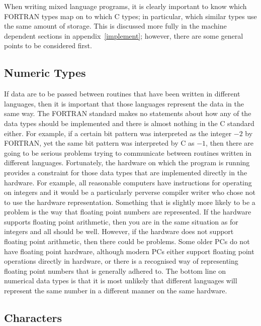 \documentclass[twoside,11pt]{article}
\newcommand{\htmlref}[2]{#1}
\newcommand{\latex}[1]{#1}
\newcommand{\xlabel}[1]{}
\renewcommand{\_}{\texttt{\symbol{95}}}
\begin{document}
When writing mixed language programs, it is clearly important to know which
FORTRAN types map on to which C types; in particular, which similar types use
the same amount of storage. This is discussed more fully in 
\htmlref{the machine dependent sections}{implement}
\latex{in appendix~\ref{implement}}; however, there are some general
points to be considered first.

\subsection{\xlabel{numeric_types}Numeric Types}

If data are to be passed between routines that have been written in different
languages, then it is important that those languages represent the data in the
same way. The FORTRAN standard makes no statements about how any of the data
types should be implemented and there is almost nothing in the C standard
either. For example, if a certain bit pattern was interpreted as the integer
$-2$ by FORTRAN, yet the same bit pattern was interpreted by C as $-1$, then
there are going to be serious problems trying to communicate between routines
written in different languages. Fortunately, the hardware on which the program
is running provides a constraint for those data types that are implemented
directly in the  hardware. For example, all reasonable computers have
instructions for operating on integers and it would be a particularly perverse
compiler writer who chose not to use the hardware representation. Something
that is slightly more likely to be a problem is the way that floating point
numbers are represented. If the hardware supports floating point arithmetic,
then you are in the same situation as for integers and all should be well.
However, if the hardware does not support floating point arithmetic, then there
could be problems. Some older PCs do not have floating point hardware, although
modern PCs either support floating point operations directly in hardware, or
there is a recognised way of representing floating point numbers that is
generally adhered to. The bottom line on numerical data types is that it is
most unlikely that different languages will represent the same number in a
different manner on the same hardware.

\subsection{\xlabel{characters}Characters}
\end{document}
